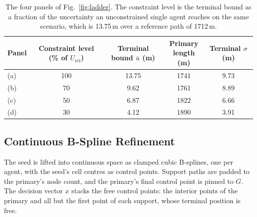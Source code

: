 \documentclass[letterpaper, 10 pt, conference]{ieeeconf}
\theoremstyle{remark}
\begin{document}
\begin{table}[t]
  \centering
  \footnotesize
  \setlength{\tabcolsep}{5pt}
  \begin{tabular}{@{}lcccc@{}}
    \toprule
    Panel & \makecell{Constraint level\\(\% of $U_\mathrm{ref}$)}
          & \makecell{Terminal\\bound $\bar{u}$ (m)}
          & \makecell{Primary\\length (m)}
          & \makecell{Terminal\\$\sigma$ (m)} \\
    \midrule
    (a) & 100 & 13.75 & 1741 & 9.73 \\
    (b) &  70 &  9.62 & 1761 & 8.89 \\
    (c) &  50 &  6.87 & 1822 & 6.66 \\
    (d) &  30 &  4.12 & 1890 & 3.91 \\
    \bottomrule
  \end{tabular}
  \caption{The four panels of Fig.~\ref{fig:ladder}. The constraint level is
    the terminal bound as a fraction of the uncertainty an unconstrained
    single agent reaches on the same scenario, which is 13.75\,m over a
    reference path of 1712\,m.}
  \label{tab:ladder}
\end{table}

\subsection{Continuous B-Spline Refinement}
\label{sec:cont}

The seed is lifted into continuous space as clamped cubic B-splines, one
per agent, with the seed's cell centres as control points. Support paths are padded to the primary's node count, and
the primary's final control point is pinned to $G$. The decision vector $x$
stacks the free control points: the interior points of the primary and all
but the first point of each support, whose terminal position is free.
\end{document}

